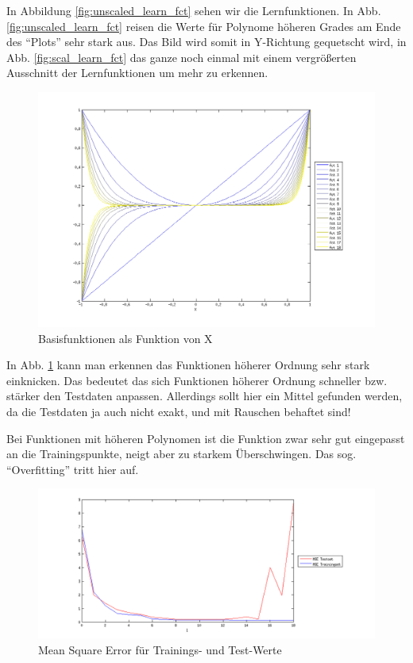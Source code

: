 In Abbildung \ref{fig:unscaled_learn_fct} sehen wir die Lernfunktionen.
In Abb. \ref{fig:unscaled_learn_fct} reisen die Werte für Polynome höheren Grades am Ende des ``Plots'' sehr stark aus.
 Das Bild wird somit in Y-Richtung gequetscht wird, in Abb. \ref{fig:scal_learn_fct} das ganze noch einmal mit einem  vergrö\ss{}erten Ausschnitt der Lernfunktionen um mehr zu erkennen.

\begin{figure}[hp!]
\begin{center}
 \includegraphics[width=1\textwidth]{./figures/1_1_1_base_fct}
 \caption[Basisfunktionen als Funktion von X]{Basisfunktionen als Funktion von X}
\label{fig:base_fct}
\end{center}
\end{figure}
In Abb. \ref{fig:base_fct} kann man erkennen das Funktionen höherer Ordnung sehr stark einknicken. Das bedeutet das sich Funktionen höherer Ordnung 
schneller bzw. stärker den Testdaten anpassen. Allerdings sollt hier ein Mittel gefunden werden, da die Testdaten ja auch nicht exakt, und mit
Rauschen behaftet sind! 



Bei Funktionen mit höheren Polynomen ist die Funktion zwar sehr gut eingepasst an die Trainingspunkte, neigt aber zu starkem Überschwingen.
Das sog. ``Overfitting'' tritt hier auf.
\clearpage

\begin{figure}[hp!]
\begin{center}
 \includegraphics[width=1\textwidth]{./figures/1_1_1_MSE}
 \caption[Mean Square Error]{Mean Square Error für Trainings- und Test-Werte}
\label{fig:MSE}
\end{center}
\end{figure}

